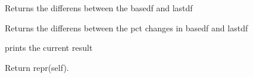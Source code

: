 \documentclass[letterpaper,10pt,english]{sphinxmanual}
\begin{document}
\begin{fulllineitems}
\begin{fulllineitems}
\end{fulllineitems}


\begin{fulllineitems}
\label{\detokenize{index:modelvis.vis.difpctlevel}}
\pysigstartsignatures
{}
\pysigstopsignatures
\sphinxAtStartPar
Returns the differens between the basedf and lastdf

\end{fulllineitems}


\begin{fulllineitems}
\label{\detokenize{index:modelvis.vis.difpct}}
\pysigstartsignatures
{}
\pysigstopsignatures
\sphinxAtStartPar
Returns the differens between the pct changes in basedf and lastdf

\end{fulllineitems}


\begin{fulllineitems}
\label{\detokenize{index:modelvis.vis.print}}
\pysigstartsignatures
{}
\pysigstopsignatures
\sphinxAtStartPar
prints the current result

\end{fulllineitems}


\begin{fulllineitems}
\label{\detokenize{index:modelvis.vis.__repr__}}
\pysigstartsignatures
{}
\pysigstopsignatures
\sphinxAtStartPar
Return repr(self).

\end{fulllineitems}



\end{fulllineitems}
\end{document}

